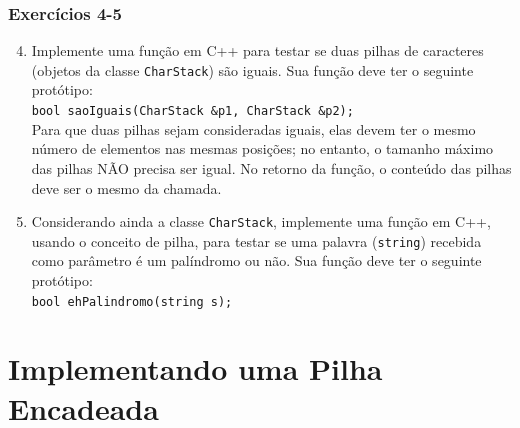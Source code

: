 \documentclass[aspectratio=169]{beamer}
\begin{document}
\begin{frame}[fragile]\frametitle{Exercícios 4-5}
\begin{enumerate}
        \setcounter{enumi}{3}

\item Implemente uma função em C++ para testar se duas pilhas de caracteres (objetos da classe \texttt{CharStack}) são iguais. Sua função deve ter o seguinte protótipo:\\
\texttt{bool saoIguais(CharStack \&p1, CharStack \&p2);}\\
Para que duas pilhas sejam consideradas iguais, elas devem ter o mesmo número de elementos nas mesmas posições; no entanto, o tamanho máximo das pilhas NÃO precisa ser igual. No retorno da função, o conteúdo das pilhas deve ser o mesmo da chamada.\\

	\item Considerando ainda a classe \texttt{CharStack}, implemente uma função em C++, usando o conceito de pilha, para testar se uma palavra (\texttt{string}) recebida como parâmetro é um palíndromo ou não. Sua função deve ter o seguinte protótipo:\\
\texttt{bool ehPalindromo(string s);}\\
\end{enumerate}
\end{frame}

\section{Implementando uma Pilha Encadeada}
\end{document}
